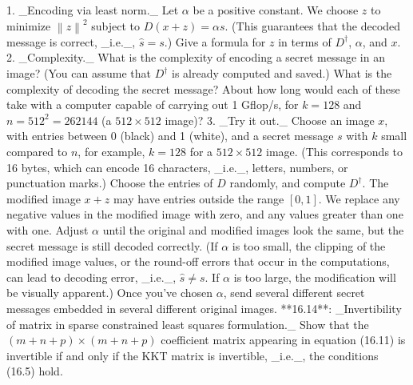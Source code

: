 1. _Encoding via least norm._ Let \(\alpha\) be a positive constant. We choose \(z\) to minimize \(\left\|z\right\|^{2}\) subject to \(D(x+z)=\alpha s\). (This guarantees that the decoded message is correct, _i.e._, \(\hat{s}=s\).) Give a formula for \(z\) in terms of \(D^{\dagger}\), \(\alpha\), and \(x\).
2. _Complexity._ What is the complexity of encoding a secret message in an image? (You can assume that \(D^{\dagger}\) is already computed and saved.) What is the complexity of decoding the secret message? About how long would each of these take with a computer capable of carrying out 1 Gflop/s, for \(k=128\) and \(n=512^{2}=262144\) (a \(512\times 512\) image)?
3. _Try it out._ Choose an image \(x\), with entries between 0 (black) and 1 (white), and a secret message \(s\) with \(k\) small compared to \(n\), for example, \(k=128\) for a \(512\times 512\) image. (This corresponds to 16 bytes, which can encode 16 characters, _i.e._, letters, numbers, or punctuation marks.) Choose the entries of \(D\) randomly, and compute \(D^{\dagger}\). The modified image \(x+z\) may have entries outside the range \([0,1]\). We replace any negative values in the modified image with zero, and any values greater than one with one. Adjust \(\alpha\) until the original and modified images look the same, but the secret message is still decoded correctly. (If \(\alpha\) is too small, the clipping of the modified image values, or the round-off errors that occur in the computations, can lead to decoding error, _i.e._, \(\hat{s}\neq s\). If \(\alpha\) is too large, the modification will be visually apparent.) Once you've chosen \(\alpha\), send several different secret messages embedded in several different original images.
**16.14**: _Invertibility of matrix in sparse constrained least squares formulation._ Show that the \((m+n+p)\times(m+n+p)\) coefficient matrix appearing in equation (16.11) is invertible if and only if the KKT matrix is invertible, _i.e._, the conditions (16.5) hold.

